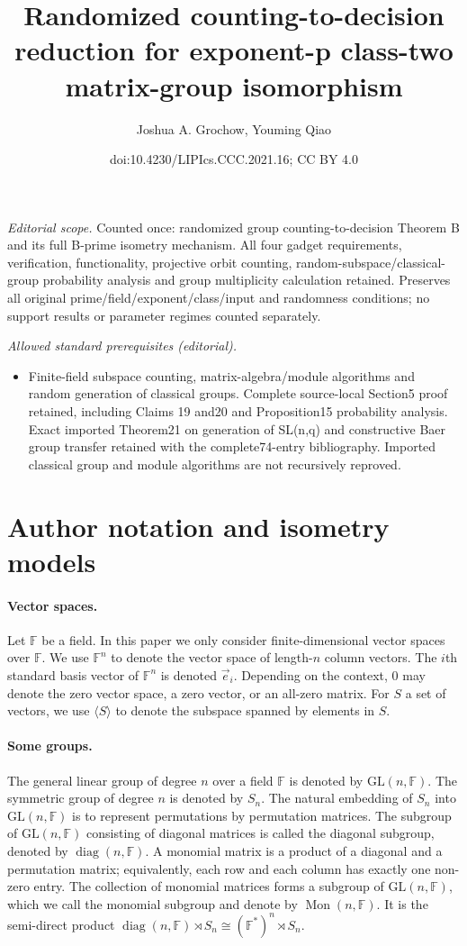 \documentclass[10pt,a4paper]{article}
\title{Randomized counting-to-decision reduction for exponent-p class-two matrix-group isomorphism}
\author{Joshua A. Grochow, Youming Qiao}
\date{doi:10.4230/LIPIcs.CCC.2021.16; CC BY 4.0}
\begin{document}
\maketitle
\noindent\textit{Editorial scope.} Counted once: randomized group counting-to-decision Theorem B and its full B-prime isometry mechanism. All four gadget requirements, verification, functionality, projective orbit counting, random-subspace/classical-group probability analysis and group multiplicity calculation retained. Preserves all original prime/field/exponent/class/input and randomness conditions; no support results or parameter regimes counted separately.\par\medskip
\noindent\textit{Allowed standard prerequisites (editorial).}\begin{itemize}
\item Finite-field subspace counting, matrix-algebra/module algorithms and random generation of classical groups. Complete source-local Section5 proof retained, including Claims 19 and20 and Proposition15 probability analysis. Exact imported Theorem21 on generation of SL(n,q) and constructive Baer group transfer retained with the complete74-entry bibliography. Imported classical group and module algorithms are not recursively reproved.
\end{itemize}\medskip
\section*{Author notation and isometry models}
\paragraph{Vector spaces.} Let $\mathbb F$ be a field. In this paper we only consider finite-dimensional vector spaces over $\mathbb F$. We use $\mathbb F^n$ to denote the vector space of length-$n$ column vectors. The $i$th standard basis vector of $\mathbb F^n$ is denoted $\vec e_i$. Depending on the context, 0 may denote the zero vector space, a zero vector, or an all-zero matrix. For $S$ a set of vectors, we use $\langle S\rangle$ to denote the subspace spanned by elements in $S$.
\paragraph{Some groups.} The general linear group of degree $n$ over a field $\mathbb F$ is denoted by $\mathrm{GL}(n,\mathbb F)$. The symmetric group of degree $n$ is denoted by $S_n$. The natural embedding of $S_n$ into $\mathrm{GL}(n,\mathbb F)$ is to represent permutations by permutation matrices. The subgroup of $\mathrm{GL}(n,\mathbb F)$ consisting of diagonal matrices is called the diagonal subgroup, denoted by $\operatorname{diag}(n,\mathbb F)$. A monomial matrix is a product of a diagonal and a permutation matrix; equivalently, each row and each column has exactly one non-zero entry. The collection of monomial matrices forms a subgroup of $\mathrm{GL}(n,\mathbb F)$, which we call the monomial subgroup and denote by $\operatorname{Mon}(n,\mathbb F)$. It is the semi-direct product $\operatorname{diag}(n,\mathbb F)\rtimes S_n\cong(\mathbb F^*)^n\rtimes S_n$.
\end{document}
